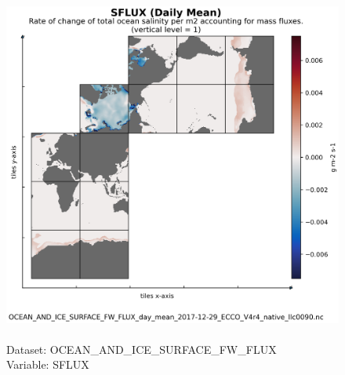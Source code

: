 \begin{figure}[H]
\centering
\includegraphics[scale=0.5]{../images/plots/native_plots/Ocean_and_Sea-Ice_Surface_Freshwater_Fluxes/SFLUX.png}
\caption{\\Dataset: OCEAN\_AND\_ICE\_SURFACE\_FW\_FLUX\\Variable: SFLUX}
\label{tab:table-OCEAN_AND_ICE_SURFACE_FW_FLUX_SFLUX-Plot}
\end{figure}
\pagebreak
